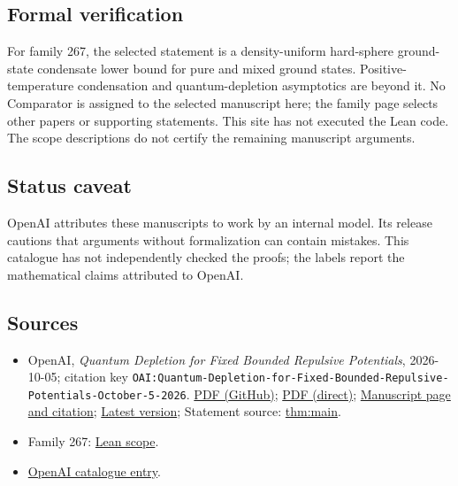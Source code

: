 \documentclass[11pt]{article}
\begin{document}
\subsection{Formal verification}
For family 267, the selected statement is a density-uniform hard-sphere ground-state condensate lower bound for pure and mixed ground states. Positive-temperature condensation and quantum-depletion asymptotics are beyond it. No Comparator is assigned to the selected manuscript here; the family page selects other papers or supporting statements. This site has not executed the Lean code. The scope descriptions do not certify the remaining manuscript arguments.

\subsection{Status caveat}
OpenAI attributes these manuscripts to work by an internal model. Its release cautions that arguments without formalization can contain mistakes. This catalogue has not independently checked the proofs; the labels report the mathematical claims attributed to OpenAI.

\subsection{Sources}
\begin{itemize}
\item OpenAI, \emph{Quantum Depletion for Fixed Bounded Repulsive Potentials}, 2026-10-05; citation key \texttt{OAI:Quantum-Depletion-for-Fixed-Bounded-Repulsive-Potentials-October-5-2026}. \href{https://github.com/openai/math/blob/adc7f1241b42e322a6451854ab7e4b4c146bf78a/preprints/Quantum-Depletion-for-Fixed-Bounded-Repulsive-Potentials-October-5-2026/fixed-repulsion-quantum-depletion.pdf}{PDF (GitHub)}; \href{https://github.com/openai/math/raw/adc7f1241b42e322a6451854ab7e4b4c146bf78a/preprints/Quantum-Depletion-for-Fixed-Bounded-Repulsive-Potentials-October-5-2026/fixed-repulsion-quantum-depletion.pdf}{PDF (direct)}; \href{https://github.com/openai/math/blob/adc7f1241b42e322a6451854ab7e4b4c146bf78a/preprints/Quantum-Depletion-for-Fixed-Bounded-Repulsive-Potentials-October-5-2026/README.md}{Manuscript page and citation}; \href{https://github.com/openai/math/blob/main/preprints/Quantum-Depletion-for-Fixed-Bounded-Repulsive-Potentials-October-5-2026/fixed-repulsion-quantum-depletion.pdf}{Latest version}; Statement source: \href{https://github.com/openai/math/blob/adc7f1241b42e322a6451854ab7e4b4c146bf78a/preprints/Quantum-Depletion-for-Fixed-Bounded-Repulsive-Potentials-October-5-2026/build/source/sections/introduction.tex\#L41}{thm:main}.
\item Family 267: \href{https://github.com/openai/math/blob/adc7f1241b42e322a6451854ab7e4b4c146bf78a/lean/docs/267.md}{Lean scope}.
\item \href{https://github.com/openai/math/blob/adc7f1241b42e322a6451854ab7e4b4c146bf78a/CONTENTS.md}{OpenAI catalogue entry}.
\end{itemize}
\end{document}
